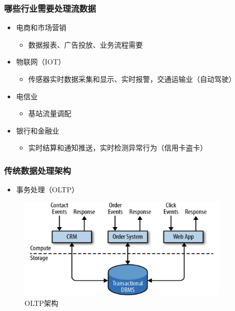 \documentclass{beamer}
\begin{document}
  \begin{frame}
    \frametitle{哪些行业需要处理流数据}
  
    \begin{itemize}
      \item 电商和市场营销
        \begin{itemize}
          \item 数据报表、广告投放、业务流程需要
        \end{itemize}
      \item 物联网（IOT）
        \begin{itemize}
          \item 传感器实时数据采集和显示、实时报警，交通运输业（自动驾驶）
        \end{itemize}
      \item 电信业
        \begin{itemize}
          \item 基站流量调配
        \end{itemize}
      \item 银行和金融业
        \begin{itemize}
          \item 实时结算和通知推送，实时检测异常行为（信用卡盗卡）
        \end{itemize}
    \end{itemize}
  \end{frame}

  \begin{frame}
    \frametitle{传统数据处理架构}
  
    \begin{itemize}
      \item 事务处理（OLTP）
    \end{itemize}

    \begin{figure}
      \centering
      \includegraphics[width=0.9\textwidth]{image4.png}
      \caption{OLTP架构}
    \end{figure}
  
  \end{frame}
\end{document}
